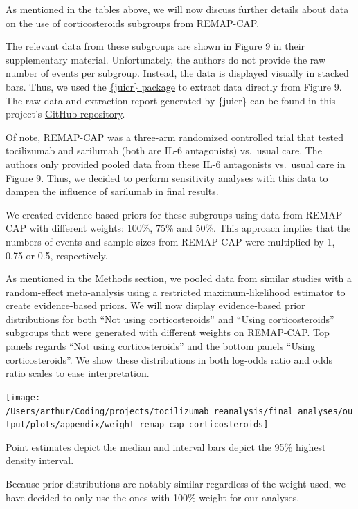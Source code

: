 \documentclass[
]{article}
\begin{document}
As mentioned in the tables above, we will now discuss further details
about data on the use of corticosteroids subgroups from REMAP-CAP.

The relevant data from these subgroups are shown in Figure 9 in their
supplementary material. Unfortunately, the authors do not provide the
raw number of events per subgroup. Instead, the data is displayed
visually in stacked bars. Thus, we used the
\href{https://cran.r-project.org/web/packages/juicr/index.html}{\{juicr\}
package} to extract data directly from Figure 9. The raw data and
extraction report generated by \{juicr\} can be found in this project's
\href{https://github.com/arthur-albuquerque/tocilizumab_reanalysis/tree/master/final_analyses/data}{GitHub
repository}.

Of note, REMAP-CAP was a three-arm randomized controlled trial that
tested tocilizumab and sarilumab (both are IL-6 antagonists) vs.~usual
care. The authors only provided pooled data from these IL-6 antagonists
vs.~usual care in Figure 9. Thus, we decided to perform sensitivity
analyses with this data to dampen the influence of sarilumab in final
results.

We created evidence-based priors for these subgroups using data from
REMAP-CAP with different weights: 100\%, 75\% and 50\%. This approach
implies that the numbers of events and sample sizes from REMAP-CAP were
multiplied by 1, 0.75 or 0.5, respectively.

As mentioned in the Methods section, we pooled data from similar studies
with a random-effect meta-analysis using a restricted maximum-likelihood
estimator to create evidence-based priors. We will now display
evidence-based prior distributions for both ``Not using
corticosteroids'' and ``Using corticosteroids'' subgroups that were
generated with different weights on REMAP-CAP. Top panels regards ``Not
using corticosteroids'' and the bottom panels ``Using corticosteroids''.
We show these distributions in both log-odds ratio and odds ratio scales
to ease interpretation.

\begin{center}\texttt{[image: /Users/arthur/Coding/projects/tocilizumab\_reanalysis/final\_analyses/output/plots/appendix/weight\_remap\_cap\_corticosteroids]} \end{center}

Point estimates depict the median and interval bars depict the 95\%
highest density interval.

Because prior distributions are notably similar regardless of the weight
used, we have decided to only use the ones with 100\% weight for our
analyses.
\end{document}
